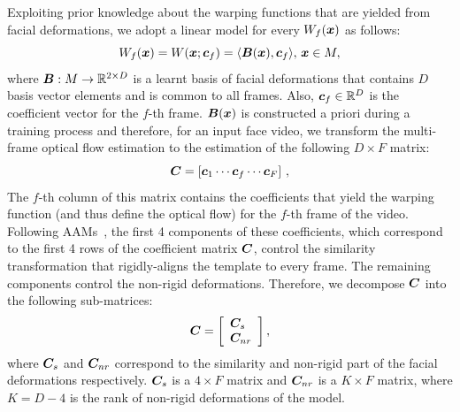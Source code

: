 Exploiting prior knowledge about the warping functions that are yielded from
facial deformations, we adopt a linear model for every $W_f(\boldsymbol{x})$ as follows:
\begin{equation}
    W_f(\boldsymbol{x}) = W(\boldsymbol{x};\boldsymbol{c}_f) = \langle \boldsymbol{B}(\boldsymbol{x}) , \boldsymbol{c}_f \rangle, \,\boldsymbol{x} \in M,
\end{equation}
where $\boldsymbol{B}:M\rightarrow \mathbb{R}^{2 \times D}$ is a learnt basis of facial deformations that
contains $D$ basis vector elements and is common to all frames. Also,
$\boldsymbol{c}_f\in\mathbb{R}^D$ is the coefficient vector for the $f$-th frame. $\boldsymbol{B}(\boldsymbol{x})$ is 
constructed a priori during a training process and
therefore, for an input face video, we transform the multi-frame optical flow
estimation to the estimation of the following $D\times F$ matrix:
\begin{equation}
    \boldsymbol{C} = \left[ \boldsymbol{c}_1 \cdots \boldsymbol{c}_f \cdots \boldsymbol{c}_F \right] \,,
\end{equation}
The $f$-th column of this matrix contains the coefficients that yield the
warping function (and thus define the optical flow) for the $f$-th frame of the
video. Following AAMs~\cite{cootes2001active}, the first 4 components of these coefficients, 
which correspond to the first 4 rows of the coefficient matrix $\boldsymbol{C}$, 
control the similarity transformation that rigidly-aligns the template to every 
frame. The remaining components control the non-rigid deformations. 
Therefore, we decompose $\boldsymbol{C}$ into the following sub-matrices:
\begin{equation}\label{E:C_DEC}
    \boldsymbol{C} =
        \left[
            \begin{array}{l}
                \boldsymbol{C}_s\\
                \boldsymbol{C}_{nr} 
            \end{array}
        \right],
\end{equation}
where $\boldsymbol{C}_s$ and $\boldsymbol{C}_{nr}$ correspond to the similarity and non-rigid 
part of the facial deformations respectively. 
$\boldsymbol{C}_s$ is a $4\times F$ matrix and $\boldsymbol{C}_{nr}$ is a $K \times F$ matrix, 
where $K=D-4$ is the rank of non-rigid deformations of the model.
